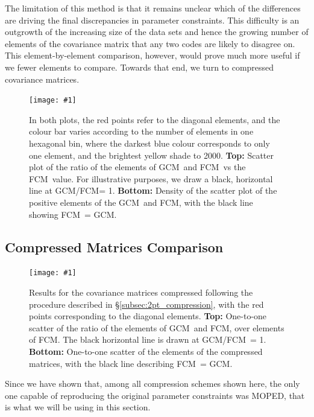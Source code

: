 \documentclass[twocolumn,nofootinbib]{\docclass}
\newcommand{\sfig}[2]{
	\texttt{[image: \#1]}
}
\newcommand{\Sfig}[2]{
	\begin{figure}[thbp]
		\sfig{../figures/#1.pdf}{\columnwidth}
		\caption{{\small #2}}
		\label{fig:#1}
	\end{figure}
}
\newcommand{\rssec}[1]{\S\ref{subsec:#1}}
\newcommand\full{FCM}
\newcommand\gaussian{GCM}
\begin{document}
	The limitation of this method is that it remains unclear which of the differences are driving the final discrepancies in parameter constraints. This difficulty is an outgrowth of the increasing size of the data sets and hence the growing number of elements of the covariance matrix that any two codes are likely to disagree on. This element-by-element comparison, however, would prove much more useful if we fewer elements to compare. Towards that end, we turn to compressed covariance matrices.
	
	\Sfig{Y1-scatter}{In both plots, the red points refer to the diagonal elements, and the colour bar varies according to the number of elements in one hexagonal bin, where the darkest blue colour corresponds to only one element, and the brightest yellow shade to 2000. \textbf{Top:} Scatter plot of the ratio of the elements of \gaussian\ and \full\ vs the \full\ value. For illustrative purposes, we draw a black, horizontal line at \gaussian/\full = 1. \textbf{Bottom:} Density of the scatter plot of the positive elements of the \gaussian\ and \full, with the black line showing \full\ = \gaussian.}
	
	\subsection{Compressed Matrices Comparison}
	\label{subsec:compare_compressed}
	
	\begin{figure}[b]
		\sfig{Comp2pt-scatter}{0.85\columnwidth}
		\caption{{\small Results for the covariance matrices compressed following the procedure described in \rssec{2pt_compression}, with the red points corresponding to the diagonal elements.
		\textbf{Top:}  One-to-one scatter of the ratio of the elements of \gaussian\ and \full, over elements of \full. The black horizontal line is drawn at \gaussian/\full\ = 1.
		\textbf{Bottom:}  One-to-one scatter of the elements of the compressed matrices, with the black line describing \full\ = \gaussian.}}
		\label{fig:Comp2pt-scatter}
	\end{figure}
	
	Since we have shown that, among all compression schemes shown here, the only one capable of reproducing the original parameter constraints was MOPED, that is what we will be using in this section.
	
\end{document}
